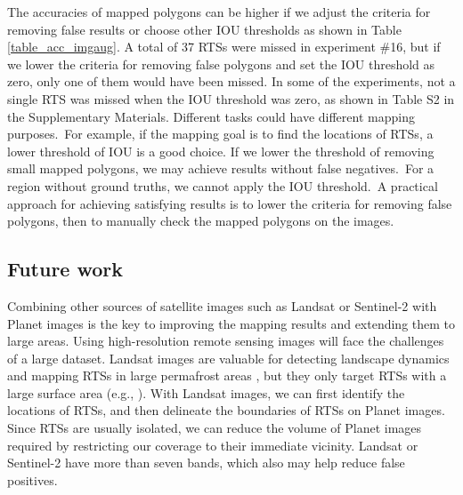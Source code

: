\documentclass[authoryear,preprint,review,12pt]{elsarticle}
\begin{document}
The accuracies of mapped polygons can be higher if we adjust the criteria for removing false results or choose other IOU thresholds as shown in Table \ref{table_acc_imgaug}. 
A total of 37 RTSs were missed in experiment \#16, but if we lower the criteria for removing false polygons and set the IOU threshold as zero, only one of them would have been missed. In some of the experiments, not a single RTS was missed when the IOU threshold was zero, as shown in Table S2 in the Supplementary Materials. Different tasks could have different mapping purposes.~For example, if the mapping goal is to find the locations of RTSs, a lower threshold of IOU is a good choice. If we lower the threshold of removing small mapped polygons, we may achieve results without false negatives.~For a region without ground truths, we cannot apply the IOU threshold.~A practical approach for achieving satisfying results is to lower the criteria for removing false polygons, then to manually check the mapped polygons on the images. 


\subsection{Future work}
\label{subsec_future}

Combining other sources of satellite images such as Landsat or Sentinel-2 with Planet images is the key to improving the mapping results and extending them to large areas. Using high-resolution remote sensing images will face the challenges of a large dataset. Landsat images are valuable for detecting landscape dynamics and mapping RTSs in large permafrost areas \citep{nitze_detection_2016, nitze_landsat-based_2017, nitze2018remote}, but they 
only target RTSs with a large surface area (e.g., \citealp{brooker2014investigating}). With Landsat images, we can first identify the locations of RTSs, and then delineate the boundaries of RTSs on Planet images. Since RTSs are usually isolated, we can reduce the volume of Planet images required by restricting our coverage to their immediate vicinity.
Landsat or Sentinel-2 have more than seven bands, which also may help reduce false positives. 
\end{document}
